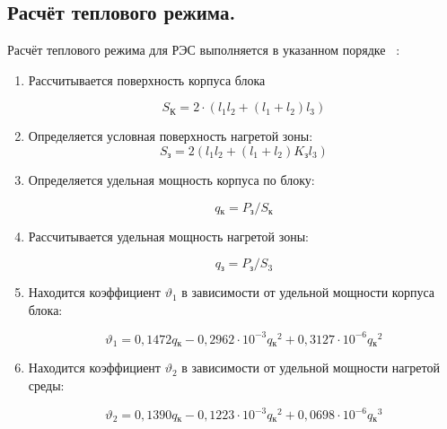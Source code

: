 \subsection{Расчёт теплового режима.} 
Расчёт теплового режима для РЭС выполняется в указанном порядке ~\cite{Rotkop1976}:
\begin{enumerate}
  
\item Рассчитывается поверхность корпуса блока

  \begin{equation}
    S\mathrm{_{К}} = 2 \cdot (l_1 l_2 + (l_1+ l_2)l_3) %
  \end{equation}

\item Определяется условная поверхность нагретой зоны:
  \begin{equation}
    S\mathrm{_{з}} = 2 (l_1 l_2 + (l_1 + l_2) K\mathrm{_{з}} l_3 ) %
  \end{equation}

\item Определяется удельная мощность корпуса по блоку:

\begin{equation}
  q\mathrm{_к} = P\mathrm{_з}/S\mathrm{_к} %
\end{equation}


\item Рассчитывается удельная мощность нагретой зоны:
  
  \begin{equation}
      q\mathrm{_з} = P\mathrm{_з}/S\mathrm{_3} %
    \end{equation}


\item Находится коэффициент $\vartheta_1$ в зависимости от удельной мощности корпуса блока:
    
\begin{equation}
\vartheta_1 = 0,1472q\mathrm{_к} - 0,2962 \cdot 10^{-3}q\mathrm{_к}^2 + 0,3127 \cdot 10^{-6}q\mathrm{_к}^2
\end{equation}

\item Находится коэффициент $\vartheta_2$ в зависимости от удельной мощности нагретой среды:

\begin{equation}
\vartheta_2 = 0,1390q\mathrm{_к} - 0,1223 \cdot 10^{-3}q\mathrm{_к}^2 + 0,0698 \cdot 10^{-6}q\mathrm{_к}^3
\end{equation}


\end{enumerate}
